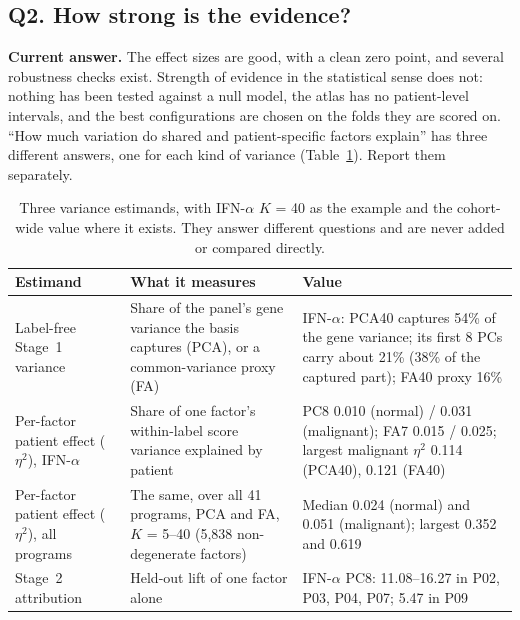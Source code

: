 \subsection{Q2. How strong is the evidence?}

\textbf{Current answer.} The effect sizes are good, with a clean zero point, and several robustness checks exist. Strength of evidence in the statistical sense does not: nothing has been tested against a null model, the atlas has no patient-level intervals, and the best configurations are chosen on the folds they are scored on. ``How much variation do shared and patient-specific factors explain'' has three different answers, one for each kind of variance (Table~\ref{tab:08-variance}). Report them separately.

\begin{table}[H]
\centering
\small
\caption{Three variance estimands, with IFN-$\alpha$ $K$ = 40 as the example and the cohort-wide value where it exists. They answer different questions and are never added or compared directly.}
\label{tab:08-variance}
\begin{tabularx}{\linewidth}{>{\raggedright\arraybackslash}p{3.0cm} >{\raggedright\arraybackslash}X >{\raggedright\arraybackslash}X}
\toprule
Estimand & What it measures & Value \\
\midrule
Label-free Stage~1 variance & Share of the panel's gene variance the basis captures (PCA), or a common-variance proxy (FA) & IFN-$\alpha$: PCA40 captures 54\% of the gene variance; its first 8 PCs carry about 21\% (38\% of the captured part); FA40 proxy 16\% \\
Per-factor patient effect ($\eta^2$), IFN-$\alpha$ & Share of one factor's within-label score variance explained by patient & PC8 0.010 (normal) / 0.031 (malignant); FA7 0.015 / 0.025; largest malignant $\eta^2$ 0.114 (PCA40), 0.121 (FA40) \\
Per-factor patient effect ($\eta^2$), all programs & The same, over all 41 programs, PCA and FA, $K$ = 5--40 (5,838 non-degenerate factors) & Median 0.024 (normal) and 0.051 (malignant); largest 0.352 and 0.619 \\
Stage~2 attribution & Held-out lift of one factor alone & IFN-$\alpha$ PC8: 11.08--16.27\pp{} in P02, P03, P04, P07; 5.47\pp{} in P09 \\
\bottomrule
\end{tabularx}
\end{table}

